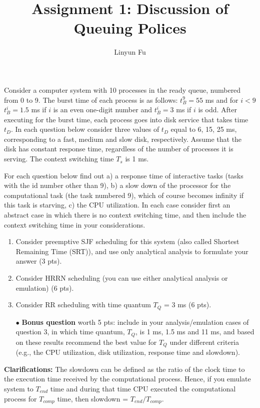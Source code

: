 \documentclass[12pt,letterpaper]{article}
\author{Linyun Fu}
\title{Assignment 1: Discussion of Queuing Polices}
\begin{document}
\maketitle
Consider a computer system with 10 processes in the ready queue, numbered from 0 to 9. The burst time of each process is as follows: $t_B^9=55$ ms and for $i < 9$ $t_B^i = 1.5$ ms if $i$ is an even one-digit number and $t_B^i = 3$ ms if $i$ is odd. After executing for the
burst time, each process goes into disk service that takes time $t_D$. In each question below
consider three values of $t_D$ equal to 6, 15, 25 ms, corresponding to a fast, medium and
slow disk, respectively. Assume that the disk has constant response time, regardless of
the number of processes it is serving. The context switching time $T_s$ is 1 ms.

For each question below find out a) a response time of interactive tasks (tasks with the id number other than 9), b) a slow down of the processor for the computational task
(the task numbered 9), which of course becomes infinity if this task is starving, c) the
CPU utilization. In each case consider first an abstract case in which there is no context
switching time, and then include the context switching time in your considerations.

\begin{enumerate}
\item Consider preemptive SJF scheduling for this system (also called Shortest
Remaining Time (SRT)), and use only analytical analysis to formulate your
answer (3 pts).
\item Consider HRRN scheduling (you can use either analytical analysis or emulation)
(6 pts).
\item Consider RR scheduling with time quantum $T_Q$ = 3 ms (6 pts).
\item[$\bullet$] {\bf Bonus question} worth 5 pts: include in your analysis/emulation cases of question 3, in
which time quantum, $T_Q$, is 1 ms, 1.5 ms and 11 ms, and based on these results recommend
the best value for $T_Q$ under different criteria (e.g., the CPU utilization, disk utilization, response time and slowdown).
\end{enumerate}

{\bf Clarifications:} The slowdown can be defined as the ratio of the clock time to the
execution time received by the computational process. Hence, if you emulate system to
$T_{end}$ time and during that time CPU executed the computational process for $T_{comp}$ time, then slowdown = $T_{end}/T_{comp}$.
\end{document}
